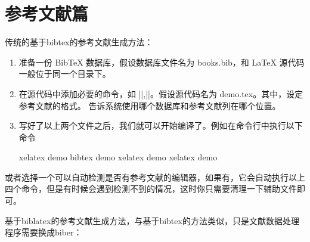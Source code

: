 %
%
%
%


\section{参考文献篇}



传统的基于bibtex的参考文献生成方法：

\begin{enumerate}

\item
  准备一份 BibTeX 数据库，假设数据库文件名为 books.bib，和 LaTeX
  源代码一般位于同一个目录下。
\item
  在源代码中添加必要的命令，如 ||,||。假设源代码名为
   demo.tex。其中，设定参考文献的格式。
  告诉系统使用哪个数据库和参考文献列在哪个位置。
\item
  写好了以上两个文件之后，我们就可以开始编译了。例如在命令行中执行以下命令
  
\begin{texinlist}
xelatex demo
bibtex demo
xelatex demo
xelatex demo
\end{texinlist}
\end{enumerate}



或者选择一个可以自动检测是否有参考文献的编辑器，如果有，它会自动执行以上四个命令，但是有时候会遇到检测不到的情况，这时你只需要清理一下辅助文件即可。

基于biblatex的参考文献生成方法，与基于bibtex的方法类似，只是文献数据处理程序需要换成biber：

